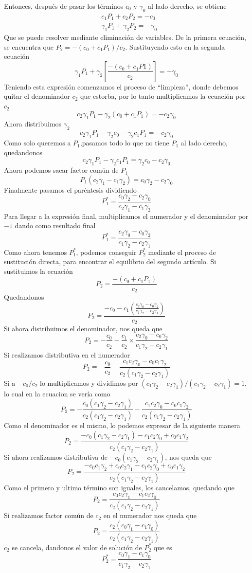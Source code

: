 Entonces, después de pasar los términos \(c_0\) y \(\gamma_0\) al lado derecho, se obtiene 
\begin{equation}
    \begin{aligned}
        & c_1P_1 + c_2P_2 = -c_0 \\
        & \gamma_1P_1 + \gamma_2P_2=-\gamma_0
    \end{aligned}
\end{equation}
Que se puede resolver mediante eliminación de variables. De la primera ecuación, se encuentra que \(P_2=-(c_0+c_1P_1)/c_2\). Sustituyendo esto en la segunda ecuación
\[
\gamma_1P_1+\gamma_2 \left[\frac{-(c_0+c_1P1)}{c_2}\right]=-\gamma_0
\]
Teniendo esta expresión comenzamos el proceso de ``limpieza'', donde debemos quitar el denominador \(c_2\) que estorba, por lo tanto multiplicamos la ecuación por \(c_2\)
\[
c_2\gamma_1P_1-\gamma_2(c_0+c_1P_1)=-c_2\gamma_0
\]
Ahora distribuimos \(\gamma_2\)
\[
c_2\gamma_1P_1-\gamma_2c_0-\gamma_2c_1P_1=-c_2\gamma_0
\]
Como solo queremos a \(P_1\),pasamos todo lo que no tiene \(P_1\) al lado derecho, quedandonos
\[
c_2\gamma_1P_1-\gamma_2c_1P_1=\gamma_2c_0-c_2\gamma_0
\]
Ahora podemos sacar factor común de \(P_1\)
\[
P_1(c_2\gamma_1-c_1\gamma_2)=c_0\gamma_2-c_2\gamma_0
\]
Finalmente pasamos el paréntesis dividiendo 
\[
P_1^\ast=\frac{c_0\gamma_2-c_2\gamma_0}{c_2\gamma_1-c_1\gamma_2}
\]
Para llegar a la expresión final, multiplicamos el numerador y el denominador por \(-1\) dando como resultado final
\[
P_1^\ast=\frac{c_2\gamma_0-c_0\gamma_2}{c_1\gamma_2-c_2\gamma_1}
\]
Como ahora tenemos \(P_1^\ast\), podemos conseguir \(P_2^\ast\) mediante el proceso de sustitución directa, para encontrar el equilibrio del segundo artículo. Si sustituimos la ecuación 
\[
P_2 = \frac{-(c_0+c_1P_1)}{c_2}
\]
Quedandonos
\[
P_2 = \frac{-c_0-c_1(\frac{c_2\gamma_0-c_0\gamma_2}{c_1\gamma_2-c_2\gamma_1})}{c_2}
\]
Si ahora distribuimos el denominador, nos queda que
\[
P_2 = -\frac{c_0}{c_2}-\frac{c_1}{c_2}\times \frac{c_2\gamma_0-c_0\gamma_2}{c_1\gamma_2-c_2\gamma_1}
\]
Si realizamos distributiva en el numerador
\[
P_2 = -\frac{c_0}{c_2}-\frac{c_1c_2\gamma_0-c_0c_1\gamma_2}{c_2(c_1\gamma_2-c_2\gamma_1)}
\]
Si a \(-c_0/c_2\) lo multiplicamos y dividimos por \((c_1\gamma_2-c_2\gamma_1)/(c_1\gamma_2-c_2\gamma_1) = 1\), lo cual en la ecuacion se vería como 
\[
P_2 = -\frac{c_0(c_1\gamma_2-c_2\gamma_1)}{c_2(c_1\gamma_2-c_2\gamma_1)}-\frac{c_1c_2\gamma_0-c_0c_1\gamma_2}{c_2(c_1\gamma_2-c_2\gamma_1)}
\]
Como el denominador es el mismo, lo podemos expresar de la siguiente manera 
\[
P_2 = \frac{-c_0(c_1\gamma_2-c_2\gamma_1)-c_1c_2\gamma_0+c_0c_1\gamma_2}{c_2(c_1\gamma_2-c_2\gamma_1)}
\]
Si ahora realizamos distributiva de \(-c_0(c_1\gamma_2-c_2\gamma_1)\), nos queda que 
\[
P_2 = \frac{-c_0c_1\gamma_2+c_0c_2\gamma_1-c_1c_2\gamma_0+c_0c_1\gamma_2}{c_2(c_1\gamma_2-c_2\gamma_1)}
\]
Como el primero y ultimo término son iguales, los cancelamos, quedando que 
\[
P_2 = \frac{c_0c_2\gamma_1-c_1c_2\gamma_0}{c_2(c_1\gamma_2-c_2\gamma_1)}
\]
Si realizamos factor común de \(c_2\) en el numerador nos queda que 
\[
P_2 = \frac{c_2(c_0\gamma_1-c_1\gamma_0)}{c_2(c_1\gamma_2-c_2\gamma_1)}
\]
\(c_2\) se cancela, dandonos el valor de solución de \(P_2^\ast\) que es
\[
P_2^\ast=\frac{c_0\gamma_1-c_1\gamma_0}{c_1\gamma_2-c_2\gamma_1}
\]

